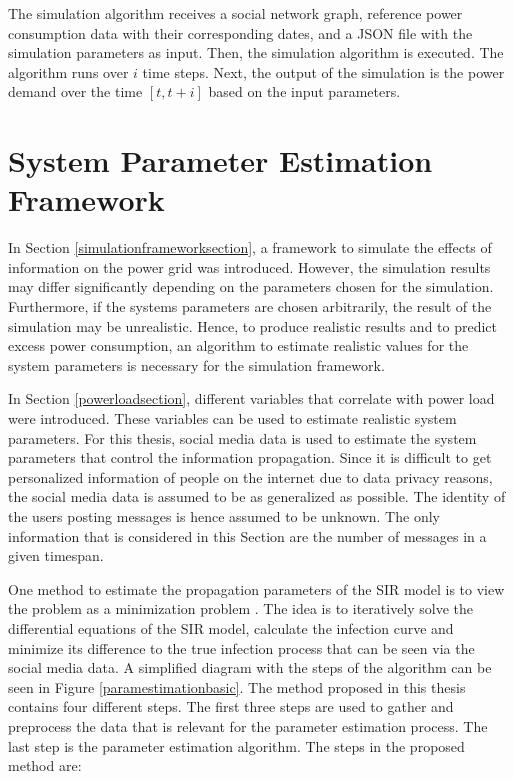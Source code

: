 The simulation algorithm receives a social 
network graph, reference power consumption data with their 
corresponding dates, and 
a JSON file with the simulation parameters as input. 
Then, the simulation algorithm is executed.
The algorithm runs over
$i$ time steps. Next, the output of the simulation is the 
power demand over the time $[t, t+i]$ based on the
input parameters.


\section{System Parameter Estimation Framework}
\label{parameterestimationalgo}

In Section \ref{simulationframeworksection}, a framework to simulate the effects 
of information on the power grid was introduced. However, the simulation results
may differ significantly depending on the parameters chosen for the simulation.
Furthermore, if the systems parameters are chosen arbitrarily,
the result of the simulation may be unrealistic. 
Hence, to produce realistic results and to predict excess power consumption, an 
algorithm to estimate realistic values for the system parameters is necessary
for the simulation framework.

In Section \ref{powerloadsection}, different variables that 
correlate with power load were introduced. These variables can be 
used to estimate realistic system parameters. For this thesis, social media data is 
used to estimate the system parameters that control the 
information propagation. Since it is difficult to get personalized 
information of people on the internet due to data privacy reasons, the
social media data is assumed to be as generalized as possible. 
The identity of the users posting messages is hence assumed to be unknown. 
The only information
that is considered in this Section are the number of messages 
in a given timespan.

One method to estimate the propagation parameters of the SIR model 
is to view the problem as a minimization problem 
\cite{jin2013epidemiological}. The idea is to iteratively solve the differential 
equations of the SIR model, calculate the infection curve and minimize 
its difference to the true infection process that can be seen via the
social media data. A simplified diagram with the steps of the algorithm
can be seen in Figure \ref{paramestimationbasic}. The method proposed 
in this thesis contains four different steps. 
The first three steps are used to gather and preprocess 
the data that is relevant for the parameter estimation process.
The last step is the parameter estimation algorithm.
The steps in the proposed method are:

